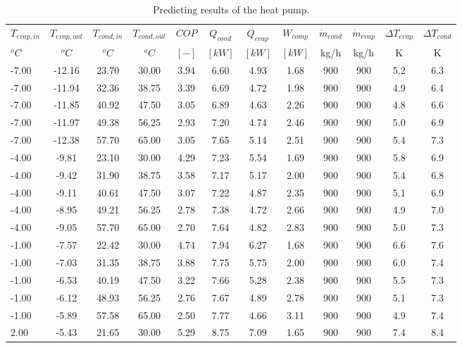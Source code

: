 \documentclass[english]{SPFShortReport}
\begin{document}
\begin{table}[!ht]
\begin{small}
\caption{Predicting results of the heat pump.}
\begin{center}
\resizebox{12cm}{!} 
{
\begin{tabular}{l | c c c c c c c c c c c } 
\hline
\hline
$T_{evap,in}$ &$T_{evap,out}$ &$T_{cond,in}$ &$T_{cond,out}$ &$COP$ &$Q_{cond}$ &$Q_{evap}$ &$W_{comp}$ &$\dot m_{cond}$ &$\dot m_{evap}$ &$\Delta T_{evap}$ &$\Delta T_{cond}$ \\ 
$^oC$ &$^oC$ &$^oC$ &$^oC$ &$[-]$ &$[kW]$ &$[kW]$ &$[kW]$ &kg/h &kg/h &K &K\\ 
\hline
-7.00 & -12.16 & 23.70 & 30.00 & 3.94 & 6.60 & 4.93 & 1.68 & 900 & 900 & 5.2 & 6.3\\ 
-7.00 & -11.94 & 32.36 & 38.75 & 3.39 & 6.69 & 4.72 & 1.98 & 900 & 900 & 4.9 & 6.4\\ 
-7.00 & -11.85 & 40.92 & 47.50 & 3.05 & 6.89 & 4.63 & 2.26 & 900 & 900 & 4.8 & 6.6\\ 
-7.00 & -11.97 & 49.38 & 56.25 & 2.93 & 7.20 & 4.74 & 2.46 & 900 & 900 & 5.0 & 6.9\\ 
-7.00 & -12.38 & 57.70 & 65.00 & 3.05 & 7.65 & 5.14 & 2.51 & 900 & 900 & 5.4 & 7.3\\ 
-4.00 & -9.81 & 23.10 & 30.00 & 4.29 & 7.23 & 5.54 & 1.69 & 900 & 900 & 5.8 & 6.9\\ 
-4.00 & -9.42 & 31.90 & 38.75 & 3.58 & 7.17 & 5.17 & 2.00 & 900 & 900 & 5.4 & 6.8\\ 
-4.00 & -9.11 & 40.61 & 47.50 & 3.07 & 7.22 & 4.87 & 2.35 & 900 & 900 & 5.1 & 6.9\\ 
-4.00 & -8.95 & 49.21 & 56.25 & 2.78 & 7.38 & 4.72 & 2.66 & 900 & 900 & 4.9 & 7.0\\ 
-4.00 & -9.05 & 57.70 & 65.00 & 2.70 & 7.64 & 4.82 & 2.83 & 900 & 900 & 5.0 & 7.3\\ 
-1.00 & -7.57 & 22.42 & 30.00 & 4.74 & 7.94 & 6.27 & 1.68 & 900 & 900 & 6.6 & 7.6\\ 
-1.00 & -7.03 & 31.35 & 38.75 & 3.88 & 7.75 & 5.75 & 2.00 & 900 & 900 & 6.0 & 7.4\\ 
-1.00 & -6.53 & 40.19 & 47.50 & 3.22 & 7.66 & 5.28 & 2.38 & 900 & 900 & 5.5 & 7.3\\ 
-1.00 & -6.12 & 48.93 & 56.25 & 2.76 & 7.67 & 4.89 & 2.78 & 900 & 900 & 5.1 & 7.3\\ 
-1.00 & -5.89 & 57.58 & 65.00 & 2.50 & 7.77 & 4.66 & 3.11 & 900 & 900 & 4.9 & 7.4\\ 
2.00 & -5.43 & 21.65 & 30.00 & 5.29 & 8.75 & 7.09 & 1.65 & 900 & 900 & 7.4 & 8.4\\ 

\end{tabular}}
\end{center}
\end{small}
\end{table}
\end{document}

